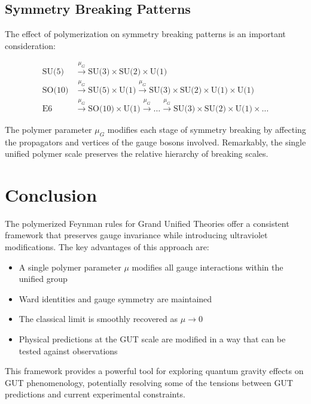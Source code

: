 \documentclass[11pt]{article}
\begin{document}
\subsection{Symmetry Breaking Patterns}

The effect of polymerization on symmetry breaking patterns is an important consideration:

\begin{equation}
\begin{aligned}
\text{SU(5)} &\xrightarrow{\mu_G} \text{SU(3)} \times \text{SU(2)} \times \text{U(1)} \\
\text{SO(10)} &\xrightarrow{\mu_G} \text{SU(5)} \times \text{U(1)} \xrightarrow{\mu_G} \text{SU(3)} \times \text{SU(2)} \times \text{U(1)} \times \text{U(1)} \\
\text{E6} &\xrightarrow{\mu_G} \text{SO(10)} \times \text{U(1)} \xrightarrow{\mu_G} \dots \xrightarrow{\mu_G} \text{SU(3)} \times \text{SU(2)} \times \text{U(1)} \times \ldots
\end{aligned}
\end{equation}

The polymer parameter $\mu_G$ modifies each stage of symmetry breaking by affecting the propagators and vertices of the gauge bosons involved. Remarkably, the single unified polymer scale preserves the relative hierarchy of breaking scales.

\section{Conclusion}

The polymerized Feynman rules for Grand Unified Theories offer a consistent framework that preserves gauge invariance while introducing ultraviolet modifications. The key advantages of this approach are:

\begin{itemize}
    \item A single polymer parameter $\mu$ modifies all gauge interactions within the unified group
    \item Ward identities and gauge symmetry are maintained
    \item The classical limit is smoothly recovered as $\mu \to 0$
    \item Physical predictions at the GUT scale are modified in a way that can be tested against observations
\end{itemize}

This framework provides a powerful tool for exploring quantum gravity effects on GUT phenomenology, potentially resolving some of the tensions between GUT predictions and current experimental constraints.
\end{document}
